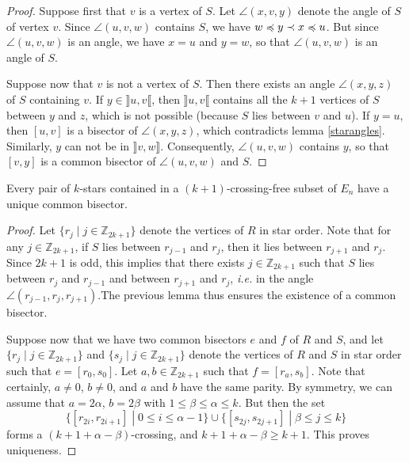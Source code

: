 \documentclass[12pt]{amsart}
\begin{document}
\begin{proof}
Suppose first that $v$ is a vertex of $S$. Let $\angle(x,v,y)$ denote the angle of $S$ of vertex $v$. Since $\angle(u,v,w)$ contains $S$, we have $w\preccurlyeq y\prec x\preccurlyeq u$. But since $\angle(u,v,w)$ is an angle, we have $x=u$ and $y=w$, so that $\angle(u,v,w)$ is an angle of $S$.

Suppose now that $v$ is not a vertex of $S$. Then there exists an angle $\angle(x,y,z)$ of $S$ containing $v$. If $y\in\rrbracket u,v\llbracket$, then $\rrbracket u,v\llbracket$ contains all the $k+1$ vertices of $S$ between $y$ and $z$, which is not possible (because $S$ lies between $v$ and $u$). If $y=u$, then $[u,v]$ is a bisector of $\angle(x,y,z)$, which contradicts lemma \ref{starangles}. Similarly, $y$ can not be in $\rrbracket v,w\rrbracket$. Consequently, $\angle(u,v,w)$ contains $y$, so that $[v,y]$ is a common bisector of $\angle(u,v,w)$ and $S$.
\end{proof}

\begin{theorem}\label{common bisector}
Every pair of $k$-stars contained in a $(k+1)$-crossing-free subset of $E_n$ have a unique common bisector.
\end{theorem}

\begin{proof}
Let $\{r_j\;|\; j\in\mathbb{Z}_{2k+1}\}$ denote the vertices of $R$ in star order. Note that for any $j\in\mathbb{Z}_{2k+1}$, if $S$ lies between $r_{j-1}$ and $r_j$, then it lies between $r_{j+1}$ and $r_j$. Since $2k+1$ is odd, this implies that there exists $j\in\mathbb{Z}_{2k+1}$ such that $S$ lies between $r_j$ and $r_{j-1}$ and between $r_{j+1}$ and $r_j$, {\it i.e.} in the angle $\angle(r_{j-1},r_j,r_{j+1})$.The previous lemma thus ensures the existence of a common bisector.

Suppose now that we have two common bisectors $e$ and $f$  of $R$ and $S$, and let $\{r_j\;|\; j\in\mathbb{Z}_{2k+1}\}$ and $\{s_j\;|\; j\in\mathbb{Z}_{2k+1}\}$ denote the vertices of $R$ and $S$ in star order such that $e=[r_0,s_0]$. Let $a,b\in\mathbb{Z}_{2k+1}$ such that $f=[r_a,s_b]$.
Note that certainly, $a\ne0$, $b\ne0$, and $a$ and $b$ have the same parity. By symmetry, we can assume that $a=2\alpha$, $b=2\beta$ with $1\le\beta\le\alpha\le k$. But then the set
$$\{[r_{2i},r_{2i+1}]\;|\; 0\le i\le \alpha-1\}\cup\{[s_{2j},s_{2j+1}]\;|\; \beta\le j\le k\}$$
forms a $(k+1+\alpha-\beta)$-crossing, and $k+1+\alpha-\beta\ge k+1$. This proves uniqueness.\end{proof}
\end{document}
